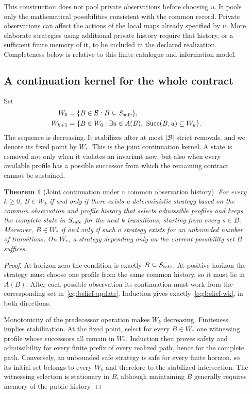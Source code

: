 \documentclass[11pt,letterpaper]{article}
\theoremstyle{plain}
\newtheorem{theorem}[proposition]{Theorem}
\theoremstyle{definition}
\theoremstyle{remark}
\begin{document}
This construction does not pool private observations before choosing $u$. It pools only the mathematical possibilities consistent with the common record. Private observations can affect the actions of the local maps already specified by $u$. More elaborate strategies using additional private history require that history, or a sufficient finite memory of it, to be included in the declared realization. Completeness below is relative to this finite catalogue and information model.

\subsection{A continuation kernel for the whole contract}
Set
\begin{align}
W_0&=\{B\in\mathcal B:B\subseteq S_{\rm safe}\},\label{eq:belief-w0}\\
W_{k+1}&=\{B\in W_0:\exists u\in A(B),\
\operatorname{Succ}(B,u)\subseteq W_k\}.\label{eq:belief-wk}
\end{align}
The sequence is decreasing. It stabilizes after at most $|\mathcal B|$ strict removals, and we denote its fixed point by $W_*$. This is the joint continuation kernel. A state is removed not only when it violates an invariant now, but also when every available profile has a possible successor from which the remaining contract cannot be sustained.

\begin{theorem}[Joint continuation under a common observation history]\label{thm:joint-viability}
For every $k\geq0$, $B\in W_k$ if and only if there exists a deterministic strategy based on the common observation and profile history that selects admissible profiles and keeps the complete state in $S_{\rm safe}$ for the next $k$ transitions, starting from every $s\in B$. Moreover, $B\in W_*$ if and only if such a strategy exists for an unbounded number of transitions. On $W_*$, a strategy depending only on the current possibility set $B$ suffices.
\end{theorem}
\begin{proof}
At horizon zero the condition is exactly $B\subseteq S_{\rm safe}$. At positive horizon the strategy must choose one profile from the same common history, so it must lie in $A(B)$. After each possible observation its continuation must work from the corresponding set in~\eqref{eq:belief-update}. Induction gives exactly~\eqref{eq:belief-wk}, in both directions.

Monotonicity of the predecessor operation makes $W_k$ decreasing. Finiteness implies stabilization. At the fixed point, select for every $B\in W_*$ one witnessing profile whose successors all remain in $W_*$. Induction then proves safety and admissibility for every finite prefix of every realized path, hence for the complete path. Conversely, an unbounded safe strategy is safe for every finite horizon, so its initial set belongs to every $W_k$ and therefore to the stabilized intersection. The witnessing selection is stationary in $B$, although maintaining $B$ generally requires memory of the public history.
\end{proof}
\end{document}
